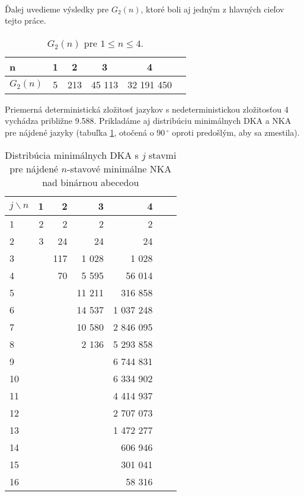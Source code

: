 \paragraph{}
Ďalej uvedieme výsledky pre $G_2(n)$, ktoré boli aj jedným z hlavných cieľov tejto práce.

\begin{table}[h]
  \centering
  \begin{tabular}{|l|c|c|c|c|r|}
    \hline
    n & 1 & 2 & 3 & 4 \\ 
    \hline
    $G_2(n)$ & 5 & 213 & 45 113 & 32 191 450 \\ 
    \hline
  \end{tabular}
  \caption{$G_2(n)$ pre $1 \leq n \leq 4$.}
\end{table}

Priemerná deterministická zložitosť jazykov s nedeterministickou zložitosťou 4 vychádza približne 9.588. Prikladáme aj distribúciu minimálnych DKA a NKA pre nájdené jazyky (tabuľka \ref{table:distrtab}, otočená o $90\,^{\circ}$ oproti predošlým, aby sa zmestila).

\begin{table}[H]
  \centering
  \resizebox{6cm}{!} {
  \begin{tabular}{|l|r|r|r|r|r|r|}
    \hline
    $j \backslash n$ & 1 & 2 & 3 & 4 \\
    \hline
    1 & 2 & 2 & 2 & 2 \\
    \hline
    2 & 3 & 24 & 24 & 24 \\
    \hline
    3 & & 117 & 1 028 & 1 028 \\
    \hline
    4 & & 70 & 5 595 & 56 014 \\
    \hline 
    5 & & & 11 211 & 316 858 \\
    \hline
    6 & & & 14 537 & 1 037 248 \\
    \hline
    7 & & & 10 580 & 2 846 095 \\
    \hline
    8 & & & 2 136 & 5 293 858 \\
    \hline
    9 & & & & 6 744 831 \\
    \hline
    10 & & & & 6 334 902 \\
    \hline
    11 & & & & 4 414 937 \\
    \hline
    12 & & & & 2 707 073 \\
    \hline
    13 & & & & 1 472 277 \\
    \hline
    14 & & & & 606 946 \\
    \hline
    15 & & & & 301 041 \\
    \hline
    16 & & & & 58 316 \\
    \hline
  \end{tabular}
  }
  \caption{Distribúcia minimálnych DKA s $j$ stavmi pre nájdené $n$-stavové minimálne NKA nad binárnou abecedou}
  \label{table:distrtab}
\end{table}

